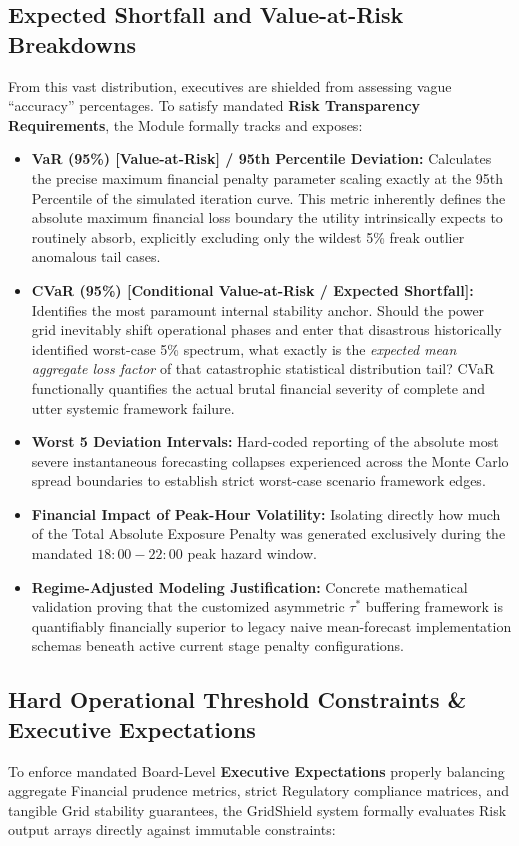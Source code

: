 \documentclass[11pt,a4paper]{article}
\begin{document}
\subsection{Expected Shortfall and Value-at-Risk Breakdowns}
From this vast distribution, executives are shielded from assessing vague ``accuracy'' percentages. To satisfy mandated \textbf{Risk Transparency Requirements}, the Module formally tracks and exposes:
\begin{itemize}
    \item \textbf{VaR (95\%) [Value-at-Risk] / 95th Percentile Deviation:} Calculates the precise maximum financial penalty parameter scaling exactly at the 95th Percentile of the simulated iteration curve. This metric inherently defines the absolute maximum financial loss boundary the utility intrinsically expects to routinely absorb, explicitly excluding only the wildest 5\% freak outlier anomalous tail cases.
    \item \textbf{CVaR (95\%) [Conditional Value-at-Risk / Expected Shortfall]:} Identifies the most paramount internal stability anchor. Should the power grid inevitably shift operational phases and enter that disastrous historically identified worst-case 5\% spectrum, what exactly is the \textit{expected mean aggregate loss factor} of that catastrophic statistical distribution tail? CVaR functionally quantifies the actual brutal financial severity of complete and utter systemic framework failure.
    \item \textbf{Worst 5 Deviation Intervals:} Hard-coded reporting of the absolute most severe instantaneous forecasting collapses experienced across the Monte Carlo spread boundaries to establish strict worst-case scenario framework edges.
    \item \textbf{Financial Impact of Peak-Hour Volatility:} Isolating directly how much of the Total Absolute Exposure Penalty was generated exclusively during the mandated $18:00 - 22:00$ peak hazard window.
    \item \textbf{Regime-Adjusted Modeling Justification:} Concrete mathematical validation proving that the customized asymmetric $\tau^*$ buffering framework is quantifiably financially superior to legacy naive mean-forecast implementation schemas beneath active current stage penalty configurations.
\end{itemize}

\subsection{Hard Operational Threshold Constraints \& Executive Expectations}
To enforce mandated Board-Level \textbf{Executive Expectations} properly balancing aggregate Financial prudence metrics, strict Regulatory compliance matrices, and tangible Grid stability guarantees, the GridShield system formally evaluates Risk output arrays directly against immutable constraints:
\end{document}
